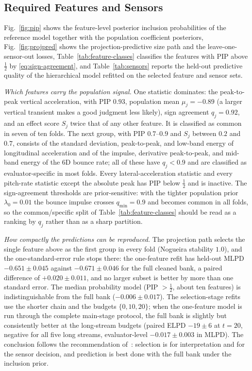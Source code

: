 \documentclass[lettersize,journal]{IEEEtran}
\begin{document}
\subsection{Required Features and Sensors}
\label{sec:results-features}

Fig.~\ref{fig:pip} shows the feature-level posterior inclusion probabilities of the reference model together with the population coefficient posteriors, Fig.~\ref{fig:projpred} shows the projection-predictive size path and the leave-one-sensor-out losses, Table~\ref{tab:feature-classes} classifies the features with PIP above $\tfrac12$ by \eqref{eq:sign-agreement}, and Table~\ref{tab:sensors} reports the held-out predictive quality of the hierarchical model refitted on the selected feature and sensor sets.

\emph{Which features carry the population signal.} One statistic dominates: the peak-to-peak vertical acceleration, with PIP $0.93$, population mean $\mu_j=-0.89$ (a larger vertical transient makes a good judgment less likely), sign agreement $q_j=0.92$, and an effect score $S_j$ twice that of any other feature. It is classified as common in seven of ten folds. The next group, with PIP $0.7$--$0.9$ and $S_j$ between $0.2$ and $0.7$, consists of the standard deviation, peak-to-peak, and low-band energy of longitudinal acceleration and of the impulse, derivative peak-to-peak, and mid-band energy of the 6D bounce rate; all of these have $q_j<0.9$ and are classified as evaluator-specific in most folds. Every lateral-acceleration statistic and every pitch-rate statistic except the absolute peak has PIP below $\tfrac12$ and is inactive. The sign-agreement thresholds are prior-sensitive: with the tighter population prior $\lambda_0=0.01$ the bounce impulse crosses $q_{\min}=0.9$ and becomes common in all folds, so the common/specific split of Table~\ref{tab:feature-classes} should be read as a ranking by $q_j$ rather than as a sharp partition.

\emph{How compactly the predictions can be reproduced.} The projection path selects the single feature above as the first group in every fold (Nogueira stability $1.0$), and the one-standard-error rule stops there: the one-feature refit has held-out MLPD $-0.651\pm0.045$ against $-0.671\pm0.046$ for the full cleaned bank, a paired difference of $+0.020\pm0.011$, and no larger subset is better by more than one standard error. The median probability model (PIP $>\tfrac12$, about ten features) is indistinguishable from the full bank ($-0.006\pm0.017$). The selection-stage refits use the shorter chain and the budgets $\{0,10,20\}$; when the one-feature model is run through the complete main-stage protocol, the full bank is slightly but consistently better at the long-stream budgets (paired ELPD $-19\pm6$ at $t=20$, negative for all five long streams, evaluator-level $-0.017\pm0.003$ in MLPD). The conclusion follows the recommendation of~\cite{riha2026selection}: selection is for interpretation and for the sensor decision, and prediction is best done with the full bank under the inclusion prior.
\end{document}
